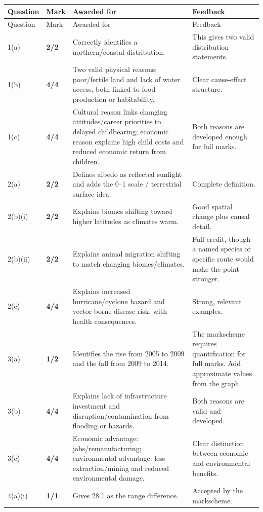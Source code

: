 \documentclass[11pt]{article}
\newcommand{\markcell}[2]{\textbf{#1/#2}}
\begin{document}
\begin{longtable}{@{}p{} p{} p{} p{}@{}}
\toprule
Question & Mark & Awarded for & Feedback \\
\midrule
\endfirsthead
\toprule
Question & Mark & Awarded for & Feedback \\
\midrule
\endhead
1(a) & \markcell{2}{2} & Correctly identifies a northern/coastal distribution. & This gives two valid distribution statements. \\
1(b) & \markcell{4}{4} & Two valid physical reasons: poor/fertile land and lack of water access, both linked to food production or habitability. & Clear cause-effect structure. \\
1(c) & \markcell{4}{4} & Cultural reason links changing attitudes/career priorities to delayed childbearing; economic reason explains high child costs and reduced economic return from children. & Both reasons are developed enough for full marks. \\
\midrule
2(a) & \markcell{2}{2} & Defines albedo as reflected sunlight and adds the 0--1 scale / terrestrial surface idea. & Complete definition. \\
2(b)(i) & \markcell{2}{2} & Explains biomes shifting toward higher latitudes as climates warm. & Good spatial change plus causal detail. \\
2(b)(ii) & \markcell{2}{2} & Explains animal migration shifting to match changing biomes/climates. & Full credit, though a named species or specific route would make the point stronger. \\
2(c) & \markcell{4}{4} & Explains increased hurricane/cyclone hazard and vector-borne disease risk, with health consequences. & Strong, relevant examples. \\
\midrule
3(a) & \markcell{1}{2} & Identifies the rise from 2005 to 2009 and the fall from 2009 to 2014. & The markscheme requires quantification for full marks. Add approximate values from the graph. \\
3(b) & \markcell{4}{4} & Explains lack of infrastructure investment and disruption/contamination from flooding or hazards. & Both reasons are valid and developed. \\
3(c) & \markcell{4}{4} & Economic advantage: jobs/remanufacturing; environmental advantage: less extraction/mining and reduced environmental damage. & Clear distinction between economic and environmental benefits. \\
\midrule
4(a)(i) & \markcell{1}{1} & Gives 28.1 as the range difference. & Accepted by the markscheme. \\

\end{longtable}
\end{document}

